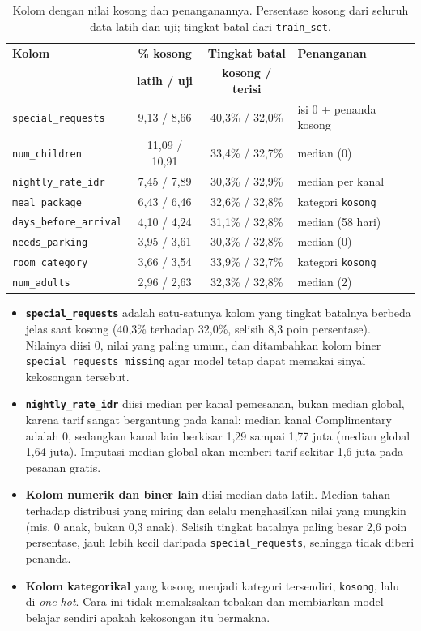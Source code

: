 \begin{table}[H]
	\centering
	\caption{Kolom dengan nilai kosong dan penanganannya. Persentase kosong dari seluruh data latih dan uji; tingkat batal dari \texttt{train\_set}.}
	\label{tab:lr-missing}
	\small
	\begin{tabular}{l c c l}
		\toprule
		\textbf{Kolom} & \textbf{\% kosong} & \textbf{Tingkat batal} & \textbf{Penanganan} \\
		& \textbf{latih / uji} & \textbf{kosong / terisi} & \\
		\midrule
		\texttt{special\_requests} & 9,13 / 8,66 & 40,3\% / 32,0\% & isi 0 + penanda kosong \\
		\texttt{num\_children} & 11,09 / 10,91 & 33,4\% / 32,7\% & median (0) \\
		\texttt{nightly\_rate\_idr} & 7,45 / 7,89 & 30,3\% / 32,9\% & median per kanal \\
		\texttt{meal\_package} & 6,43 / 6,46 & 32,6\% / 32,8\% & kategori \texttt{kosong} \\
		\texttt{days\_before\_arrival} & 4,10 / 4,24 & 31,1\% / 32,8\% & median (58 hari) \\
		\texttt{needs\_parking} & 3,95 / 3,61 & 30,3\% / 32,8\% & median (0) \\
		\texttt{room\_category} & 3,66 / 3,54 & 33,9\% / 32,7\% & kategori \texttt{kosong} \\
		\texttt{num\_adults} & 2,96 / 2,63 & 32,3\% / 32,8\% & median (2) \\
		\bottomrule
	\end{tabular}
\end{table}

\begin{itemize}
	\item \textbf{\texttt{special\_requests}} adalah satu-satunya kolom yang tingkat batalnya berbeda jelas saat kosong (40,3\% terhadap 32,0\%, selisih 8,3 poin persentase). Nilainya diisi 0, nilai yang paling umum, dan ditambahkan kolom biner \texttt{special\_requests\_missing} agar model tetap dapat memakai sinyal kekosongan tersebut.
	\item \textbf{\texttt{nightly\_rate\_idr}} diisi median per kanal pemesanan, bukan median global, karena tarif sangat bergantung pada kanal: median kanal Complimentary adalah 0, sedangkan kanal lain berkisar 1,29 sampai 1,77 juta (median global 1,64 juta). Imputasi median global akan memberi tarif sekitar 1,6 juta pada pesanan gratis.
	\item \textbf{Kolom numerik dan biner lain} diisi median data latih. Median tahan terhadap distribusi yang miring dan selalu menghasilkan nilai yang mungkin (mis. 0 anak, bukan 0,3 anak). Selisih tingkat batalnya paling besar 2,6 poin persentase, jauh lebih kecil daripada \texttt{special\_requests}, sehingga tidak diberi penanda.
	\item \textbf{Kolom kategorikal} yang kosong menjadi kategori tersendiri, \texttt{kosong}, lalu di-\textit{one-hot}. Cara ini tidak memaksakan tebakan dan membiarkan model belajar sendiri apakah kekosongan itu bermakna.
\end{itemize}

